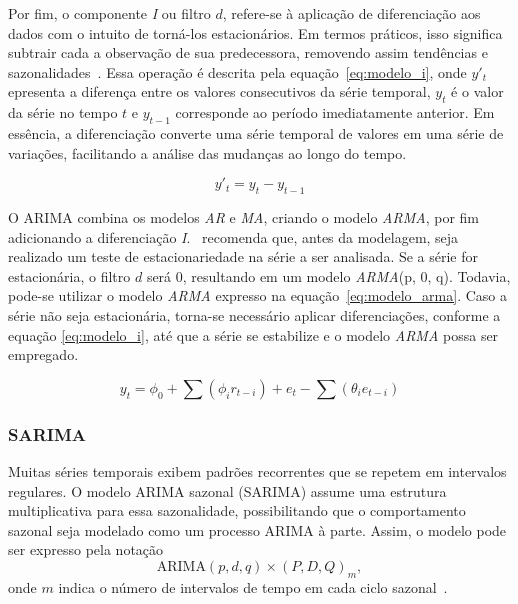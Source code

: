             Por fim, o componente \emph{I} ou filtro \(d\), refere-se à aplicação de diferenciação aos dados 
            com o intuito de torná-los estacionários. Em termos práticos, isso significa subtrair cada a
            observação de sua predecessora, removendo assim tendências e sazonalidades~\cite{nielsen2021analise,correa2024}. 
            Essa operação é descrita pela equação~\eqref{eq:modelo_i}, onde \(y'_t\) epresenta a diferença 
            entre os valores consecutivos da série temporal, \(y_t\) é o valor da série no tempo \(t\) e \(y_{t-1}\)
            corresponde ao período imediatamente anterior. Em essência, a diferenciação converte uma série 
            temporal de valores em uma série de variações, facilitando a análise das mudanças ao longo do 
            tempo.
            
            \begin{equation}
                y'_t = y_t - y_{t-1}
                \label{eq:modelo_i}
            \end{equation}  

            O ARIMA combina os modelos \emph{AR} e \emph{MA}, criando o modelo \emph{ARMA}, por fim adicionando 
            a diferenciação \emph{I}.~ recomenda que, antes da modelagem, seja realizado um teste
            de estacionariedade na série a ser analisada. Se a série for estacionária, o filtro \(d\) será 0, 
            resultando em um modelo \emph{ARMA}(p, 0, q). Todavia, pode-se utilizar o modelo \emph{ARMA}
            expresso na equação~\eqref{eq:modelo_arma}.  Caso a série não seja estacionária, torna-se necessário aplicar 
            diferenciações, conforme a equação \eqref{eq:modelo_i}, até que a série se estabilize e o modelo \emph{ARMA} possa 
            ser empregado.

            
            \begin{equation}
                y_t = \phi_0 + \sum (\phi_i r_{t-i}) + e_t - \sum (\theta_i e_{t-i}) 
                \label{eq:modelo_arma}
            \end{equation}
        
        \subsubsection{SARIMA}
            Muitas séries temporais exibem padrões recorrentes que se repetem em intervalos regulares. O modelo 
            ARIMA sazonal (SARIMA) assume uma estrutura multiplicativa para essa sazonalidade, possibilitando 
            que o comportamento sazonal seja modelado como um processo ARIMA à parte. Assim, o modelo pode ser 
            expresso pela notação
            \[
            \text{ARIMA}(p,d,q) \times (P,D,Q)_m,
            \]
            onde \( m \) indica o número de intervalos de tempo em cada ciclo sazonal~\cite{nielsen2021analise}.

